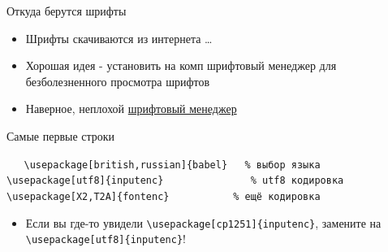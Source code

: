 \documentclass[aspectratio=169]{beamer} %
\begin{document}
{
\begin{frame}{Откуда берутся шрифты}
\Large
\begin{itemize}
\item Шрифты скачиваются из интернета \ldots
\item Хорошая идея - установить на комп шрифтовый менеджер для безболезненного просмотра шрифтов
\item Наверное, неплохой \href{http://fontba.se/}{ шрифтовый менеджер}
\end{itemize}
\end{frame}
}


\begin{frame}[fragile]{Самые первые строки}
\begin{block}{  }
\verb|   \usepackage[british,russian]{babel}   % выбор языка| \newline
\verb|   \usepackage[utf8]{inputenc}               % utf8 кодировка| \newline
\verb|   \usepackage[X2,T2A]{fontenc}           % ещё кодировка|
\end{block}

\begin{itemize}
\item Если вы где-то увидели \verb|\usepackage[cp1251]{inputenc}|,  замените  на  \verb|\usepackage[utf8]{inputenc}|!
\end{itemize}

\end{frame}
\end{document}
